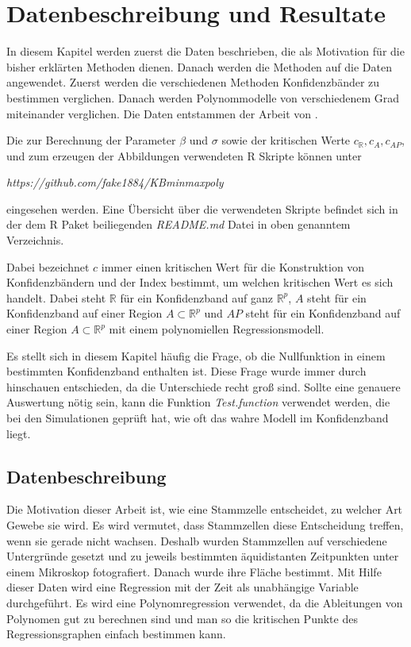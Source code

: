 \documentclass[12pt,a4paper]{article}
\theoremstyle{definition}
\theoremstyle{definition}
\theoremstyle{definition}
\theoremstyle{definition}
\begin{document}
\newpage
\section{Datenbeschreibung und Resultate}
\label{Datenbeschreibung und Resultate}
In diesem Kapitel werden zuerst die Daten beschrieben, die als Motivation für die bisher erklärten Methoden dienen. Danach werden die Methoden auf die Daten angewendet. Zuerst werden die verschiedenen Methoden Konfidenzbänder zu bestimmen verglichen. Danach werden Polynommodelle von verschiedenem Grad miteinander verglichen. Die Daten entstammen der Arbeit von \cite{Rehfeldt10}.

Die zur Berechnung der Parameter $\beta$ und  $\sigma$ sowie der kritischen Werte $c_{\mathbb{R}}, c_{A}, c_{AP}$, und zum erzeugen der Abbildungen verwendeten R Skripte können unter 

\begin{center}
\textit{https://github.com/fake1884/KBminmaxpoly} 
\end{center}

eingesehen werden. Eine Übersicht über die verwendeten Skripte befindet sich in der dem R Paket beiliegenden \textit{README.md} Datei in oben genanntem Verzeichnis.

Dabei bezeichnet $c$ immer einen kritischen Wert für die Konstruktion von Konfidenzbändern und der Index bestimmt, um welchen kritischen Wert es sich handelt. Dabei steht $\mathbb{R}$ für ein Konfidenzband auf ganz $\mathbb{R}^{p}$, $A$ steht für ein Konfidenzband auf einer Region $A \subset \mathbb{R}^{p}$ und $AP$ steht für ein Konfidenzband auf einer Region $A \subset \mathbb{R}^{p}$ mit einem polynomiellen Regressionsmodell.

Es stellt sich in diesem Kapitel häufig die Frage, ob die Nullfunktion in einem bestimmten Konfidenzband enthalten ist. Diese Frage wurde immer durch hinschauen entschieden, da die Unterschiede recht groß sind. Sollte eine genauere Auswertung nötig sein, kann die Funktion \textit{Test.function} verwendet werden, die bei den Simulationen geprüft hat, wie oft das wahre Modell im Konfidenzband liegt.

\subsection{Datenbeschreibung}
Die Motivation dieser Arbeit ist, wie eine Stammzelle entscheidet, zu welcher Art Gewebe sie wird. Es wird vermutet, dass Stammzellen diese Entscheidung treffen, wenn sie gerade nicht wachsen. Deshalb wurden Stammzellen auf verschiedene Untergründe gesetzt und zu jeweils bestimmten äquidistanten Zeitpunkten unter einem Mikroskop fotografiert. Danach wurde ihre Fläche bestimmt. Mit Hilfe dieser Daten wird eine Regression mit der Zeit als unabhängige Variable durchgeführt. Es wird eine Polynomregression verwendet, da die Ableitungen von Polynomen gut zu berechnen sind und man so die kritischen Punkte des Regressionsgraphen einfach bestimmen kann.
\end{document}
